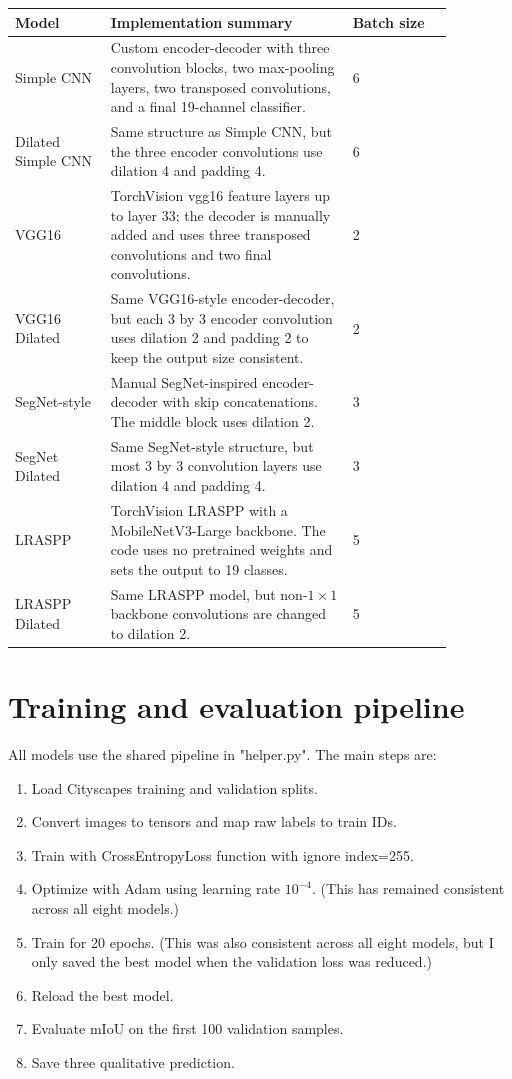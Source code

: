 \documentclass[12pt]{article}
\begin{document}
\begin{center}
\small
\renewcommand{\arraystretch}{1.25}
\begin{tabular}{|p{0.19\linewidth}|p{0.48\linewidth}|p{0.2\linewidth}|}
\hline
\textbf{Model} & \textbf{Implementation summary} & \textbf{Batch size} \\
\hline
Simple CNN & Custom encoder-decoder with three convolution blocks, two max-pooling layers, two transposed convolutions, and a final 19-channel classifier. & 6 \\
\hline
Dilated Simple CNN & Same structure as Simple CNN, but the three encoder convolutions use dilation 4 and padding 4.& 6 \\
\hline
VGG16 & TorchVision vgg16 feature layers up to layer 33; the decoder is manually added and uses three transposed convolutions and two final convolutions. & 2 \\
\hline
VGG16 Dilated & Same VGG16-style encoder-decoder, but each 3 by 3 encoder convolution uses dilation 2 and padding 2 to keep the output size consistent. & 2 \\
\hline
SegNet-style & Manual SegNet-inspired encoder-decoder with skip concatenations. The middle block uses dilation 2. & 3 \\
\hline
SegNet Dilated & Same SegNet-style structure, but most 3 by 3 convolution layers use dilation 4 and padding 4. & 3 \\
\hline
LRASPP\cite{mobilenetv3} & TorchVision LRASPP with a MobileNetV3-Large backbone. The code uses no pretrained weights and sets the output to 19 classes. & 5 \\
\hline
LRASPP Dilated & Same LRASPP model, but non-$1 \times 1$ backbone convolutions are changed to dilation 2. & 5 \\
\hline
\end{tabular}
\end{center}


\section{Training and evaluation pipeline}
All models use the shared pipeline in "{helper.py}". The main steps are:
\begin{enumerate}
    \item Load Cityscapes training and validation splits.
    \item Convert images to tensors and map raw labels to train IDs.
    \item Train with CrossEntropyLoss function with ignore index=255.
    \item Optimize with Adam using learning rate $10^{-4}$. (This has remained consistent across all eight models.)
    \item Train for 20 epochs. (This was also consistent across all eight models, but I only saved the best model when the validation loss was reduced.)
    \item Reload the best model.
    \item Evaluate mIoU on the first 100 validation samples.
    \item Save three qualitative prediction.
\end{enumerate}
\end{document}
